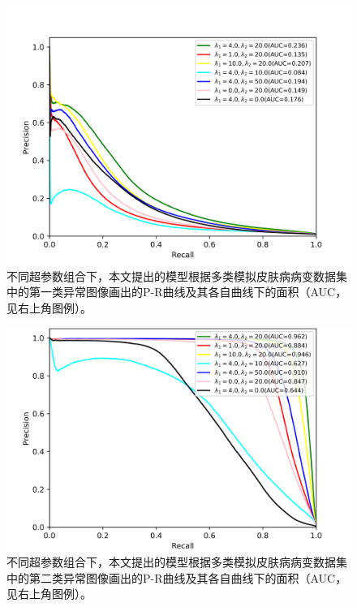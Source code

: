 \begin{figure}[h]
	\centering
	\includegraphics[width=1.0\textwidth]{figure/pr_curve_multi_skin_hyper_paras/IMAGE_NET_pr_curve.png}
	\caption{不同超参数组合下，本文提出的模型根据多类模拟皮肤病病变数据集中的第一类异常图像画出的P-R曲线及其各自曲线下的面积（AUC，见右上角图例）。} 
	\label{fig:multi_simulate_pr_curve_image_net_hyper_paras}
\end{figure}
\vspace{-0.2cm}
\begin{figure}[h]
	\centering
	\includegraphics[width=1.0\textwidth]{figure/pr_curve_multi_skin_hyper_paras/SKIN_pr_curve.png}
	\caption{不同超参数组合下，本文提出的模型根据多类模拟皮肤病病变数据集中的第二类异常图像画出的P-R曲线及其各自曲线下的面积（AUC，见右上角图例）。}
	\label{fig:multi_simulate_pr_curve_skin_hyper_paras}
\end{figure}
